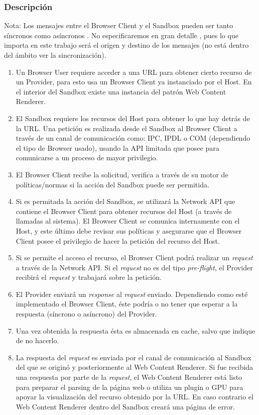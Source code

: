 \subsubsection{Descripción}
Nota: Los mensajes entre el Browser Client y el Sandbox pueden ser tanto síncronos como asíncronos \cite{firefoxIPC,GCIPC}. No especificaremos en gran detalle , pues lo que importa en este trabajo será el origen y destino de los mensajes (no está dentro del ámbito ver la sincronización).
	\begin{enumerate}
		\item Un Browser User requiere acceder a una URL para obtener cierto recurso de un Provider, para esto usa un Browser Client ya instanciado por el Host. En el interior del Sandbox existe una instancia del patrón Web Content Renderer. 
		\item El Sandbox requiere los recursos del Host para obtener lo que hay detrás de la URL. Una petición es realizada desde el Sandbox al Browser Client a través de un canal de comunicación como: IPC, IPDL o COM (dependiendo el tipo de Browser usado), usando la API limitada que posee para comunicarse a un proceso de mayor privilegio. 
		\item El Browser Client recibe la solicitud, verifica a través de su motor de políticas/normas si la acción del Sandbox puede ser permitida.
		\item Si es permitada la acción del Sandbox, se utilizará la Network API que contiene el Browser Client para obtener recursos del Host (a través de llamadas al sistema). El Browser Client se comunica internamente con el Host, y este último debe revisar sus políticas y asegurarse que el Browser Client posee el privilegio de hacer la petición del recurso del Host.
		\item Si se permite el acceso el recurso, el Browser Client podrá realizar un \textit{request} a través de la Network API. Si el \textit{request} no es del tipo \textit{pre-flight}, el Provider recibirá el \textit{request} y trabajará sobre la petición.
		\item El Provider enviará un \textit{response} al \textit{request} enviado. Dependiendo como esté implementado el Browser Client, éste podría o no tener que esperar a la respuesta (síncrono o asíncrono) del Provider.
		\item Una vez obtenida la respuesta ésta es almacenada en cache, salvo que indique de no hacerlo.
		\item La respuesta del \textit{request} es enviada por el canal de comunicación al Sandbox del que se originó y posteriormente al Web Content Renderer. Si fue recibida una respuesta por parte de la \textit{request}, el Web Content Renderer está listo para preparar el parsing de la página web o utiliza un plugin o GPU para apoyar la visualización del recurso obtenido por la URL. En caso contrario el Web Content Renderer dentro del Sandbox creará una página de error.

\end{enumerate}
